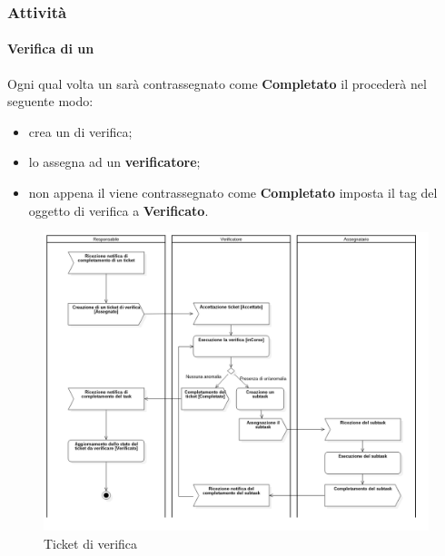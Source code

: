 \subsubsection{Attività}
	\paragraph{Verifica di un }
	Ogni qual volta un  sarà contrassegnato come \textbf{Completato} il \RES {} procederà nel seguente modo: 
	\begin{itemize}
		\item crea un  di verifica;
		\item lo assegna ad un \textbf{verificatore};
		\item non appena il  viene contrassegnato come \textbf{Completato} imposta il tag del  oggetto di verifica a \textbf{Verificato}.
	\end{itemize}
	\begin{figure}
		\centering
		\includegraphics[scale=0.40]{img/ticketVerifica.png}
		\caption{Ticket di verifica}
	\end{figure}
